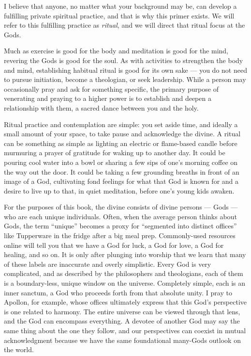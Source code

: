 \documentclass[
]{book}
\begin{document}
I believe that anyone, no matter what your background may be, can develop a fulfilling private spiritual practice, and that is why this primer exists. We will refer to this fulfilling practice as \emph{ritual}, and we will direct that ritual focus at the Gods.

Much as exercise is good for the body and meditation is good for the mind, revering the Gods is good for the soul. As with activities to strengthen the body and mind, establishing habitual ritual is good for its own sake --- you do not need to pursue initiation, become a theologian, or seek leadership. While a person may occasionally pray and ask for something specific, the primary purpose of venerating and praying to a higher power is to establish and deepen a relationship with them, a sacred dance between you and the holy.

Ritual practice and contemplation are simple: you set aside time, and ideally a small amount of your space, to take pause and acknowledge the divine. A ritual can be something as simple as lighting an electric or flame-based candle before murmuring a prayer of gratitude for waking up to another day. It could be pouring cool water into a bowl or sharing a few sips of one's morning coffee on the way out the door. It could be taking a few grounding breaths in front of an image of a God, cultivating fond feelings for what that God is known for and a desire to live up to that, in quiet meditation, before one's young kids awaken.

For the purposes of this book, the divine consists of divine persons --- Gods --- who are each unique individuals. Often, when the average person thinks about Gods, the term ``unique'' becomes a proxy for ``segmented into distinct offices'' like Tupperware in the fridge after a big meal prep. Commonly-used resources online will tell you that we have a God for luck, a God for love, a God for healing, and so on. It is only after plunging into worship that we learn that many of these labels are inaccurate and overly simplistic. Every God is very complicated, and as described by the philosophers and theologians, each of them is a boundary-less, unique window on the universe. Completely simple, each is an inner sanctum, a God who proceeds forth from that absolute unity. I pray to Apollon, for example, whose offices ultimately express that this God's perspective is one related to harmony. The entire universe can be viewed through that lens, and the God can encompass everything. A devotee of another God may say the same thing about the one they follow, and our perspectives can coexist in mutual acknowledgment because we have the same foundational many-Gods outlook on the world.
\end{document}
